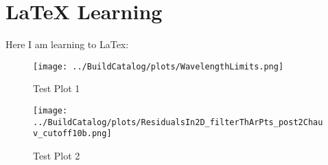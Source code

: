 \chapter{LaTeX Learning} \label{chapter:LaTeXLearning} 

Here I am learning to LaTex:

\begin{figure}[h]
    \centering
    \texttt{[image: ../BuildCatalog/plots/WavelengthLimits.png]} 
    \caption{Test Plot 1}
    \label{fig:WavelengthLimits}
\end{figure}
%
\begin{figure}[h]
    \centering
    \texttt{[image: ../BuildCatalog/plots/ResidualsIn2D\_filterThArPts\_post2Chauv\_cutoff10b.png]} 
    \caption{Test Plot 2}
    \label{fig:ResidualsIn2D_filterThArPts_post2Chauv_cutoff10b}
\end{figure}
